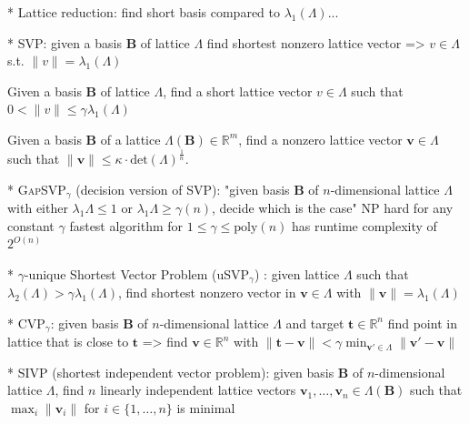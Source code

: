 \documentclass[
  a4paper,  %
  twoside,  %
  bibliography=totoc,
  headsepline,
  cleardoublepage=empty,
  parskip=half,
  draft=false
]{scrbook}
\begin{document}
* Lattice reduction: find short basis compared to $\lambda_1(\Lambda)$...

* SVP: given a basis $\mathbf{B}$ of lattice $\Lambda$ find shortest nonzero lattice vector =>  $v\in \Lambda$ s.t. $\| v \| = \lambda_1(\Lambda)$

\begin{definition} \label{def:gammaSVP} %
  Given a basis $\mathbf{B}$ of lattice $\Lambda$, find a short lattice vector $v\in \Lambda$ such that $0 < \| v \| \leq \gamma \lambda_1(\Lambda)$
\end{definition}

\begin{definition} \label{def:kappaHSVP} %
  Given a basis $\mathbf{B}$ of a lattice $\Lambda(\mathbf{B}) \in \mathbb{R}^m$, find a nonzero lattice vector $\mathbf{v} \in \Lambda$ such that $\| \mathbf{v} \| \leq \kappa \cdot \text{det}(\Lambda)^{\frac{1}{n}}$.
\end{definition}

* \textsc{GapSVP}$_\gamma$ (decision version of \textsc{SVP}): "given basis $\mathbf{B}$ of $n$-dimensional lattice $\Lambda$ with either $\lambda_1{\Lambda} \leq 1$ or $\lambda_1{\Lambda} \geq \gamma(n)$, decide which is the case" %
NP hard for any constant $\gamma$ %
fastest algorithm for $1\leq \gamma \leq \text{poly}(n)$ has runtime complexity of $2^{O(n)}$

* $\gamma$-unique Shortest Vector Problem (uSVP$_\gamma$) \cite{LM09}: given lattice $\Lambda$ such that $\lambda_2(\Lambda) > \gamma \lambda_1(\Lambda)$, find shortest nonzero vector in $\mathbf{v} \in \Lambda$ with $\|\mathbf{v}\| = \lambda_1(\Lambda)$

* CVP$_\gamma$: given  basis $\mathbf{B}$ of $n$-dimensional lattice $\Lambda$ and target $\mathbf{t}\in\mathbb{R}^n$ find point in lattice that is close to $\mathbf{t}$ => find  $\mathbf{v} \in \mathbb{R}^n$ with $\|\mathbf{t} - \mathbf{v}\| < \gamma \min_{\mathbf{v}' \in \Lambda} \|\mathbf{v}' - \mathbf{v}\|$

* \textsc{SIVP} (shortest independent vector problem): given  basis $\mathbf{B}$ of $n$-dimensional lattice $\Lambda$, find $n$ linearly independent lattice vectors $\mathbf{v}_1, \ldots, \mathbf{v}_n \in \Lambda(\mathbf{B})$ such that $\max_i \|\mathbf{v}_i\|$ for $i \in \{1, \ldots, n\}$ is minimal
\end{document}
